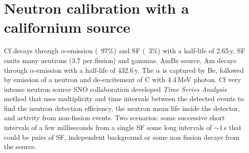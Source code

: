 \clearpage
\chapter{Neutron calibration with a californium source}


Cf decays through $\alpha$-emission (~97\%) %
and SF (~3\%) with a half-life of 2.65\,y.
SF emits many neutrons (3.7 per fission) and gammas.
AmBe source, Am decays through %
$\alpha$-emission with a half-life of 432.6\,y.
The $\alpha$ is captured by Be, %
followed by emission of a neutron and %
de-excitement of C\tapi{*} with 4.4\,MeV photon.
Cf very intense neutron source
SNO collaboration developed \emph{Time Series Analysis} method
that uses multiplicity and time intervals between the detected events %
to find the neutron detection efficiency, the neutron mean life inside the detector, and activity from non-fission events.
Two scenarios:
some successive short intervals of a few milliseconds from a single SF
some long intervals of $\sim1$\,s that could be pairs of SF, %
independent background or some non fission decays from the source. 
